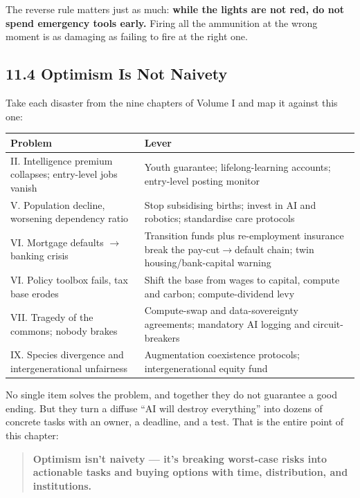 \documentclass[11pt,a4paper]{article}
\begin{document}
The reverse rule matters just as much: \textbf{while the lights are not red, do not spend emergency tools early.} Firing all the ammunition at the wrong moment is as damaging as failing to fire at the right one.

\subsection{11.4 Optimism Is Not Naivety}

Take each disaster from the nine chapters of Volume I and map it against this one:

\begin{center}

\begin{tabularx}{\textwidth}{lX}
\toprule
Problem & Lever \\
\midrule
II. Intelligence premium collapses; entry-level jobs vanish & Youth guarantee; lifelong-learning accounts; entry-level posting monitor \\
V. Population decline, worsening dependency ratio & Stop subsidising births; invest in AI and robotics; standardise care protocols \\
VI. Mortgage defaults $\to$ banking crisis & Transition funds plus re-employment insurance break the pay-cut$\to$default chain; twin housing/bank-capital warning \\
VI. Policy toolbox fails, tax base erodes & Shift the base from wages to capital, compute and carbon; compute-dividend levy \\
VII. Tragedy of the commons; nobody brakes & Compute-swap and data-sovereignty agreements; mandatory AI logging and circuit-breakers \\
IX. Species divergence and intergenerational unfairness & Augmentation coexistence protocols; intergenerational equity fund \\
\bottomrule
\end{tabularx}
\end{center}

No single item solves the problem, and together they do not guarantee a good ending. But they turn a diffuse ``AI will destroy everything'' into dozens of concrete tasks with an owner, a deadline, and a test. That is the entire point of this chapter:

\begin{quote}
\textbf{Optimism isn't naivety --- it's breaking worst-case risks into actionable tasks and buying options with time, distribution, and institutions.}
\end{quote}
\end{document}
